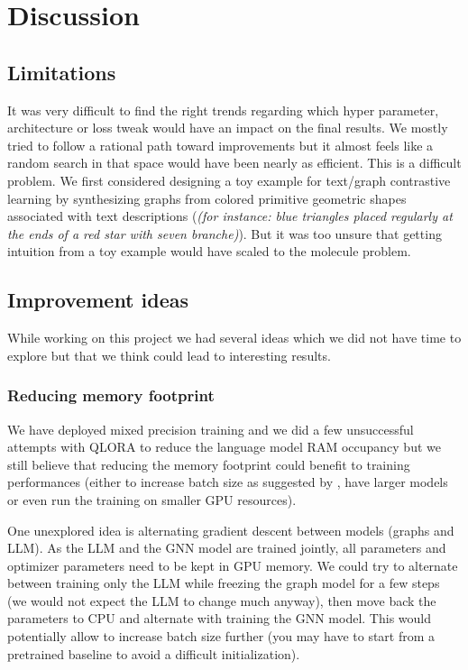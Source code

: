 \section{Discussion}
\label{sec:discussion}
\subsection{Limitations}
\label{sec:limitations}
It was very difficult to find the right trends regarding which hyper parameter, architecture or loss tweak would have an impact on the final results. We mostly tried to follow a rational path toward improvements but it almost feels like a random search in that space would have been nearly as efficient. This is a difficult problem. We first considered designing a toy example for text/graph contrastive learning by synthesizing graphs from colored primitive geometric shapes associated with text descriptions (\textit{(for instance: blue triangles placed regularly at the ends of a red star with seven branche)}). But it was too unsure that getting intuition from a toy example would have scaled to the molecule problem.

\subsection{Improvement ideas}
\label{sec:unexplored_ideas}
While working on this project we had several ideas which we did not have time to explore but that we think could lead to interesting results.

\subsubsection{Reducing memory footprint}
\label{sec:increase_batch_size}
We have deployed mixed precision training and we did a few unsuccessful attempts with QLORA to reduce the language model RAM occupancy but we still believe that reducing the memory footprint could benefit to training performances (either to increase batch size as suggested by \cite{CLIP}, have larger models or even run the training on smaller GPU resources).

One unexplored idea is alternating gradient descent between models (graphs and LLM). As the LLM and the GNN model are trained jointly, all parameters and optimizer parameters need to be kept in GPU memory. We could try to alternate between training only the LLM while freezing the graph model for a few steps (we would not expect the LLM to change much anyway), then move back the parameters to CPU and alternate with training the GNN model. This would potentially allow to increase batch size further (you may have to start from a pretrained baseline to avoid a difficult initialization).


